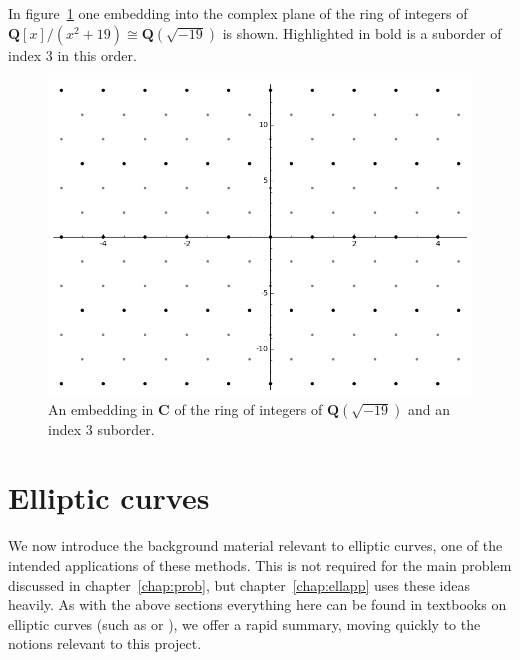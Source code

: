\documentclass[12pt,a4paper,abstracton,bibtotoc]{scrreprt}
\theoremstyle{definition}
\newcommand{\QQ}{\mathbf{Q}}
\newcommand{\CC}{\mathbf{C}}
\begin{document}
In figure~\ref{fig:sageord} one embedding into the complex plane of the ring of integers of $\QQ[x]/(x^2 + 19)\cong \QQ(\sqrt{-19})$ is shown.
Highlighted in bold is a suborder of index 3 in this order.
\begin{figure}
\centering
\includegraphics[scale=0.6]{sageord}
\caption{\label{fig:sageord} An embedding in $\CC$ of the ring of integers of $\QQ(\sqrt{-19})$ and an index 3 suborder.}
\end{figure}

%


\section{Elliptic curves}
\label{sec:ell}

We now introduce the background material relevant to elliptic curves, one of the intended applications of these methods.
This is not required for the main problem discussed in chapter~\ref{chap:prob}, but chapter~\ref{chap:ellapp} uses these ideas heavily.
As with the above sections everything here can be found in textbooks on elliptic curves (such as \cite{knapp} or \cite{cassels}), we offer a rapid summary, moving quickly to the notions relevant to this project.
\end{document}
